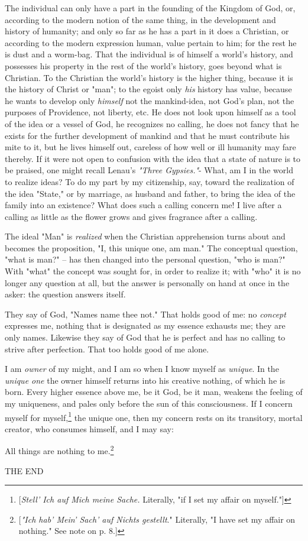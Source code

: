 The individual can only have a part in the founding of the Kingdom of God, or, 
according to the modern notion of the same thing, in the development and 
history of humanity; and only so far as he has a part in it does a Christian, 
or according to the modern expression human, value pertain to him; for the 
rest he is dust and a worm-bag. That the individual is of himself a world's 
history, and possesses his property in the rest of the world's history, goes 
beyond what is Christian. To the Christian the world's history is the higher 
thing, because it is the history of Christ or "{}man"{}; to the egoist only 
\textit{his} history has value, because he wants to develop only 
\textit{himself} not the mankind-idea, not God's plan, not the purposes of 
Providence, not liberty, etc. He does not look upon himself as a tool of the 
idea or a vessel of God, he recognizes no calling, he does not fancy that he 
exists for the further development of mankind and that he must contribute his 
mite to it, but he lives himself out, careless of how well or ill humanity may 
fare thereby. If it were not open to confusion with the idea that a state of 
nature is to be praised, one might recall Lenau's \textit{"{}Three 
Gypsies."{}}- What, am I in the world to realize ideas? To do my part by my 
citizenship, say, toward the realization of the idea "{}State,"{} or by 
marriage, as husband and father, to bring the idea of the family into an 
existence? What does such a calling concern me! I live after a calling as 
little as the flower grows and gives fragrance after a calling.

The ideal "{}Man"{} is \textit{realized} when the Christian apprehension turns 
about and becomes the proposition, "{}I, this unique one, am man."{} The 
conceptual question, "{}what is man?"{} -- has then changed into the personal 
question, "{}who is man?"{} With "{}what"{} the concept was sought for, in 
order to realize it; with "{}who"{} it is no longer any question at all, but 
the answer is personally on hand at once in the asker: the question answers 
itself.

They say of God, "{}Names name thee not."{} That holds good of me: no 
\textit{concept} expresses me, nothing that is designated as my essence 
exhausts me; they are only names. Likewise they say of God that he is perfect 
and has no calling to strive after perfection. That too holds good of me 
alone.

I am \textit{owner} of my might, and I am so when I know myself as 
\textit{unique}. In the \textit{unique one} the owner himself returns into his 
creative nothing, of which he is born. Every higher essence above me, be it 
God, be it man, weakens the feeling of my uniqueness, and pales only before 
the sun of this consciousness. If I concern myself for 
myself,\footnote{[\textit{Stell' Ich auf Mich meine Sache.} Literally, "{}if I 
set my affair on myself."{}]} the unique one, then my concern rests on its 
transitory, mortal creator, who consumes himself, and I may say:

All things are nothing to me.\footnote{[\textit{"{}Ich hab' Mein' Sach' auf 
Nichts gestellt}."{} Literally, "{}I have set my affair on nothing."{} See 
note on p. 8.]}

\begin{center}
THE END\end{center}
